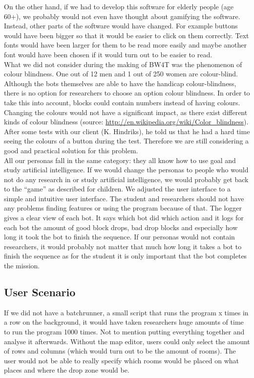 \documentclass[]{article}
\begin{document}
On the other hand, if we had to develop this software for elderly people (age 60+), we probably would not even have thought about gamifying the software. Instead, other parts of the software would have changed. For example buttons would have been bigger so that it would be easier to click on them correctly. Text fonts would have been larger for them to be read more easily and maybe another font would have been chosen if it would turn out to be easier to read.\\

What we did not consider during the making of BW4T was the phenomenon of colour blindness. One out of 12 men and 1 out of 250 women are colour-blind. Although the bots themselves are able to have the handicap colour-blindness, there is no option for researchers to choose an option colour blindness. In order to take this into account, blocks could contain numbers instead of having colours. Changing the colours would not have a significant impact, as there exist different kinds of colour blindness (source: \url{http://en.wikipedia.org/wiki/Color_blindness}). \\

After some tests with our client (K. Hindriks), he told us that he had a hard time seeing the colours of a button during the test. Therefore we are still considering a good and practical solution for this problem.\\

All our personas fall in the same category: they all know how to use goal and study artificial intelligence. If we would change the personas to people who would not do any research in or study artificial intelligence, we would probably get back to the “game” as described for children. We adjusted the user interface to a simple and intuitive user interface. The student and researchers should not have any problems finding features or using the program because of that. The logger gives a clear view of each bot. It says which bot did which action and it logs for each bot the amount of good block drops, bad drop blocks and especially how long it took the bot to finish the sequence. If our personas would not contain researchers, it would probably not matter that much how long it takes a bot to finish the sequence as for the student it is only important that the bot completes the mission.

\subsection{User Scenario}
If we did not have a batchrunner, a small script that runs the program x times in a row on the background, it would have taken researchers huge amounts of time to run the program 1000 times. Not to mention putting everything together and analyse it afterwards. Without the map editor, users could only select the amount of rows and columns (which would turn out to be the amount of rooms). The user would not be able to really specify which rooms would be placed on what places and where the drop zone would be. \\
\end{document}
